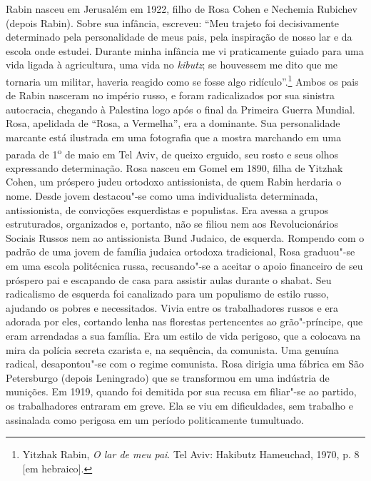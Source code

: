 Rabin nasceu em Jerusalém em 1922, filho de Rosa Cohen e Nechemia
Rubichev (depois Rabin). Sobre sua infância, escreveu: ``Meu trajeto foi
decisivamente determinado pela personalidade de meus pais, pela
inspiração de nosso lar e da escola onde estudei. Durante minha infância
me vi praticamente guiado para uma vida ligada à agricultura, uma vida
no \textit{kibutz}; se houvessem me dito que me tornaria um militar, haveria
reagido como se fosse algo ridículo''.\footnote{Yitzhak Rabin, 
\textit{O lar de meu pai}. Tel Aviv: Hakibutz Hameuchad, 1970, p. 8 {[}em hebraico{]}.} Ambos
os pais de Rabin nasceram no império russo, e foram radicalizados por
sua sinistra autocracia, chegando à Palestina logo após o final da
Primeira Guerra Mundial. Rosa, apelidada de ``Rosa, a Vermelha'', era a
dominante. Sua personalidade marcante está ilustrada em uma fotografia
que a mostra marchando em uma parada de 1\textsuperscript{o} de maio em
Tel Aviv, de queixo erguido, seu rosto e seus olhos expressando
determinação. Rosa nasceu em Gomel em 1890, filha de Yitzhak Cohen, um
próspero judeu ortodoxo antissionista, de quem Rabin herdaria o nome.
Desde jovem destacou"-se como uma individualista determinada,
antissionista, de convicções esquerdistas e populistas. Era avessa a
grupos estruturados, organizados e, portanto, não se filiou nem aos
Revolucionários Sociais Russos nem ao antissionista Bund Judaico, de
esquerda. Rompendo com o padrão de uma jovem de família judaica ortodoxa
tradicional, Rosa graduou"-se em uma escola politécnica russa,
recusando"-se a aceitar o apoio financeiro de seu próspero pai e
escapando de casa para assistir aulas durante o shabat. Seu radicalismo
de esquerda foi canalizado para um populismo de estilo russo, ajudando
os pobres e necessitados. Vivia entre os trabalhadores russos e era
adorada por eles, cortando lenha nas florestas pertencentes ao
grão"-príncipe, que eram arrendadas a sua família. Era um estilo de vida
perigoso, que a colocava na mira da polícia secreta czarista e, na
sequência, da comunista. Uma genuína radical, desapontou"-se com o regime
comunista. Rosa dirigia uma fábrica em São Petersburgo (depois
Leningrado) que se transformou em uma indústria de munições. Em 1919,
quando foi demitida por sua recusa em filiar"-se ao partido, os
trabalhadores entraram em greve. Ela se viu em dificuldades, sem
trabalho e assinalada como perigosa em um período politicamente
tumultuado.

